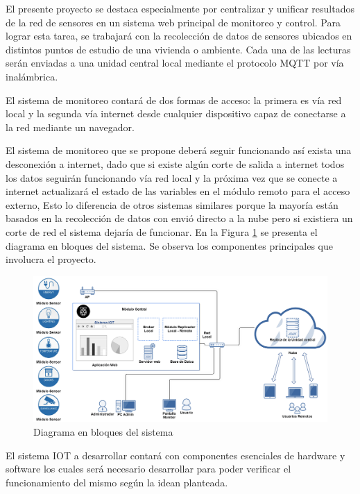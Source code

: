 \documentclass[11pt]{charter}
\begin{document}
El presente proyecto se destaca especialmente por centralizar y unificar resultados de la red de sensores en un sistema web principal de monitoreo y control. Para lograr esta tarea, se trabajará con la recolección de datos de sensores ubicados en distintos puntos de estudio de una vivienda o ambiente. Cada una de las lecturas serán enviadas a una unidad central local mediante el protocolo MQTT por vía inalámbrica.

El sistema de monitoreo contará de dos formas de acceso: la primera es vía red local y la segunda vía internet desde cualquier dispositivo capaz de conectarse a la red mediante un navegador.

El sistema de monitoreo que se propone deberá seguir funcionando así exista una desconexión a internet, dado que si existe algún corte de salida a internet todos los datos seguirán funcionando vía red local y la próxima vez que se conecte a internet actualizará el estado de las variables en el módulo remoto para el acceso externo, Esto lo diferencia de otros sistemas similares porque la mayoría están basados en la recolección de datos con envió directo a la nube pero si existiera un corte de red el sistema dejaría de funcionar. En la Figura \ref{fig:diagBloques} se presenta el diagrama en bloques del sistema. Se observa los componentes principales que involucra el proyecto.

\vspace{20px}

\begin{figure}[htpb]
\centering 
\includegraphics[width=1.07\textwidth]{./Figuras/diagBloques.png}
\caption{Diagrama en bloques del sistema}
\label{fig:diagBloques}
\end{figure}

\vspace{20px}

El sistema IOT a desarrollar contará con componentes esenciales de hardware y software los cuales será necesario desarrollar para poder verificar el funcionamiento del mismo según la idean planteada. 
\end{document}
